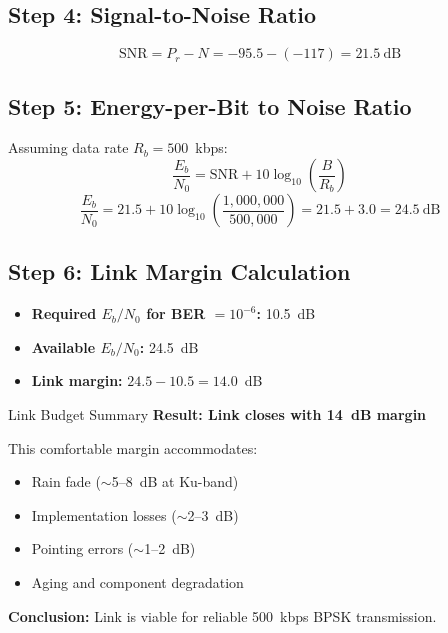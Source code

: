 \subsection*{Step 4: Signal-to-Noise Ratio}

\begin{equation}
\mathrm{SNR} = P_r - N = -95.5 - (-117) = 21.5~\text{dB}
\end{equation}

\subsection*{Step 5: Energy-per-Bit to Noise Ratio}

Assuming data rate $R_b = 500$~kbps:
\begin{equation}
\frac{E_b}{N_0} = \mathrm{SNR} + 10\log_{10}\left(\frac{B}{R_b}\right)
\end{equation}
\begin{equation}
\frac{E_b}{N_0} = 21.5 + 10\log_{10}\left(\frac{1{,}000{,}000}{500{,}000}\right) = 21.5 + 3.0 = 24.5~\text{dB}
\end{equation}

\subsection*{Step 6: Link Margin Calculation}

\begin{itemize}
\item \textbf{Required $E_b/N_0$ for BER $= 10^{-6}$:} 10.5~dB
\item \textbf{Available $E_b/N_0$:} 24.5~dB
\item \textbf{Link margin:} $24.5 - 10.5 = 14.0$~dB
\end{itemize}

\begin{calloutbox}[colback=black!8!white,colframe=black]{Link Budget Summary}
\textbf{Result: Link closes with 14~dB margin}

This comfortable margin accommodates:
\begin{itemize}
\item Rain fade ($\sim$5--8~dB at Ku-band)
\item Implementation losses ($\sim$2--3~dB)
\item Pointing errors ($\sim$1--2~dB)
\item Aging and component degradation
\end{itemize}

\textbf{Conclusion:} Link is viable for reliable 500~kbps BPSK transmission.
\end{calloutbox}

